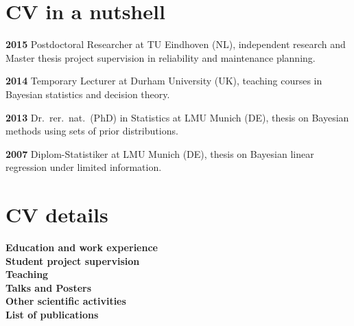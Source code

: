 \documentclass[a4paper]{simplecv}
\begin{document}
\section{CV in a nutshell}
\begin{topic}
\item[\bfseries 2015] Postdoctoral Researcher at TU Eindhoven (NL),
independent research and Master thesis project supervision in reliability and maintenance planning.
\item[\bfseries 2014] Temporary Lecturer at Durham University (UK),
teaching courses in Bayesian statistics and decision theory.
\item[\bfseries 2013] Dr.\ rer.\ nat.\ (PhD) in Statistics at LMU Munich (DE),
thesis on Bayesian methods using sets of prior distributions.
\item[\bfseries 2007] Diplom-Statistiker at LMU Munich (DE),
thesis on Bayesian linear regression under limited information.
\end{topic}


\section{CV details}
\textbf{\sf Education and work experience} \dotfill \pageref{education}\\
\textbf{\sf Student project supervision} \dotfill \pageref{supervision}\\
\textbf{\sf Teaching} \dotfill \pageref{teaching}\\
\textbf{\sf Talks and Posters} \dotfill \pageref{talks}\\
\textbf{\sf Other scientific activities} \dotfill \pageref{other}\\
\textbf{\sf List of publications} \dotfill \pageref{publications}\\


\end{document}
